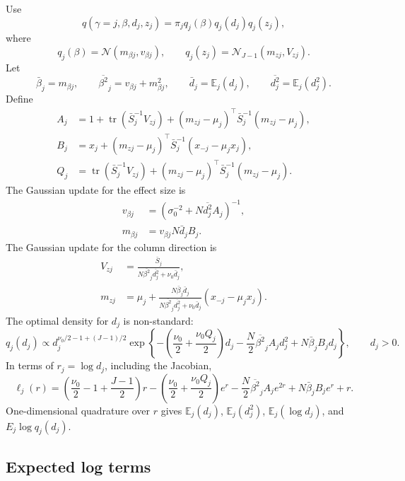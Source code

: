 \documentclass[11pt]{article}
\newcommand{\Sbar}{\bar S}
\newcommand{\E}{\mathbb E}
\newcommand{\tr}{\operatorname{tr}}
\newcommand{\Normal}{\mathcal N}
\begin{document}
Use
\[
q(\gamma=j,\beta,d_j,z_j)
=
\pi_jq_j(\beta)q_j(d_j)q_j(z_j),
\]
where
\[
q_j(\beta)=\Normal(m_{\beta j},v_{\beta j}),\qquad
q_j(z_j)=\Normal_{J-1}(m_{zj},V_{zj}).
\]
Let
\[
\bar\beta_j=m_{\beta j},\qquad
\overline{\beta^2}_j=v_{\beta j}+m_{\beta j}^2,\qquad
\bar d_j=\E_j(d_j),\qquad
\overline{d_j^2}=\E_j(d_j^2).
\]
Define
\begin{align}
A_j
&=
1+\tr(\Sbar_j^{-1}V_{zj})
+(m_{zj}-\mu_j)^\top \Sbar_j^{-1}(m_{zj}-\mu_j),\\
B_j
&=
x_j+(m_{zj}-\mu_j)^\top
\Sbar_j^{-1}(x_{-j}-\mu_jx_j),\\
Q_j
&=
\tr(\Sbar_j^{-1}V_{zj})
+(m_{zj}-\mu_j)^\top \Sbar_j^{-1}(m_{zj}-\mu_j).
\end{align}
The Gaussian update for the effect size is
\begin{align}
v_{\beta j}
&=
\left(\sigma_0^{-2}+N\overline{d_j^2}A_j\right)^{-1},\\
m_{\beta j}
&=
v_{\beta j}N\bar d_jB_j.
\end{align}
The Gaussian update for the column direction is
\begin{align}
V_{zj}
&=
\frac{\Sbar_j}
{N\overline{\beta^2}_j\overline{d_j^2}+\nu_0\bar d_j},\\
m_{zj}
&=
\mu_j+
\frac{N\bar\beta_j\bar d_j}
{N\overline{\beta^2}_j\overline{d_j^2}+\nu_0\bar d_j}
(x_{-j}-\mu_jx_j).
\end{align}
The optimal density for \(d_j\) is non-standard:
\[
q_j(d_j)
\propto
d_j^{\nu_0/2-1+(J-1)/2}
\exp\left\{
-\left(\frac{\nu_0}{2}+\frac{\nu_0 Q_j}{2}\right)d_j
-\frac{N}{2}\overline{\beta^2}_jA_jd_j^2
+N\bar\beta_jB_jd_j
\right\},
\qquad d_j>0.
\]
In terms of \(r_j=\log d_j\), including the Jacobian,
\[
\ell_j(r)
=
\left(\frac{\nu_0}{2}-1+\frac{J-1}{2}\right)r
-\left(\frac{\nu_0}{2}+\frac{\nu_0 Q_j}{2}\right)e^r
-\frac{N}{2}\overline{\beta^2}_jA_je^{2r}
+N\bar\beta_jB_je^r
+r.
\]
One-dimensional quadrature over \(r\) gives
\(\E_j(d_j)\), \(\E_j(d_j^2)\), \(\E_j(\log d_j)\), and
\(E_j\log q_j(d_j)\).

\subsection{Expected log terms}
\end{document}
